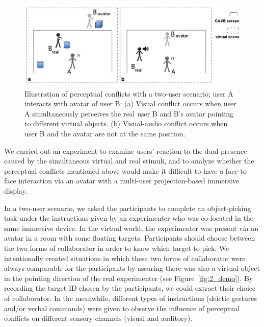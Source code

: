 \begin{figure}[ht]
  \centering
  \includegraphics[width=\textwidth]{figures/2_inconsistency}
  \caption{\label{fig:2_inconsistency}Illustration of perceptual conflicts with a two-user scenario; user A interacts with avatar of user B: (a) Visual conflict occurs when user A simultaneously perceives the real user B and B's avatar pointing to different virtual objects. (b) Visual-audio conflict occurs when user B and the avatar are not at the same position.}
\end{figure}

We carried out an experiment to examine users' reaction to the dual-presence caused by the simultaneous virtual and real stimuli, and to analyze whether the perceptual conflicts mentioned above would make it difficult to have a face-to-face interaction via an avatar with a multi-user projection-based immersive display.

In a two-user scenario, we asked the participants to complete an object-picking task under the instructions given by an experimenter who was co-located in the same immersive device. In the virtual world, the experimenter was present via an avatar in a room with some floating targets. Participants should choose between the two forms of collaborator in order to know which target to pick. We intentionally created situations in which these two forms of collaborator were always comparable for the participants by assuring there was also a virtual object in the pointing direction of the real experimenter (see Figure~\ref{fig:2_demo}). By recording the target ID chosen by the participants, we could extract their choice of collaborator. In the meanwhile, different types of instructions (deictic gestures and/or verbal commands) were given to observe the influence of perceptual conflicts on different sensory channels (visual and auditory).

